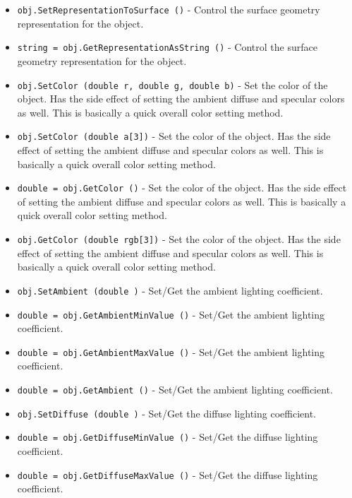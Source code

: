 \begin{itemize}
\item  \verb|obj.SetRepresentationToSurface ()| -  Control the surface geometry representation for the object.

\item  \verb|string = obj.GetRepresentationAsString ()| -  Control the surface geometry representation for the object.

\item  \verb|obj.SetColor (double r, double g, double b)| -  Set the color of the object. Has the side effect of setting the
 ambient diffuse and specular colors as well. This is basically
 a quick overall color setting method.

\item  \verb|obj.SetColor (double a[3])| -  Set the color of the object. Has the side effect of setting the
 ambient diffuse and specular colors as well. This is basically
 a quick overall color setting method.

\item  \verb|double = obj.GetColor ()| -  Set the color of the object. Has the side effect of setting the
 ambient diffuse and specular colors as well. This is basically
 a quick overall color setting method.

\item  \verb|obj.GetColor (double rgb[3])| -  Set the color of the object. Has the side effect of setting the
 ambient diffuse and specular colors as well. This is basically
 a quick overall color setting method.

\item  \verb|obj.SetAmbient (double )| -  Set/Get the ambient lighting coefficient.

\item  \verb|double = obj.GetAmbientMinValue ()| -  Set/Get the ambient lighting coefficient.

\item  \verb|double = obj.GetAmbientMaxValue ()| -  Set/Get the ambient lighting coefficient.

\item  \verb|double = obj.GetAmbient ()| -  Set/Get the ambient lighting coefficient.

\item  \verb|obj.SetDiffuse (double )| -  Set/Get the diffuse lighting coefficient.

\item  \verb|double = obj.GetDiffuseMinValue ()| -  Set/Get the diffuse lighting coefficient.

\item  \verb|double = obj.GetDiffuseMaxValue ()| -  Set/Get the diffuse lighting coefficient.


\end{itemize}
